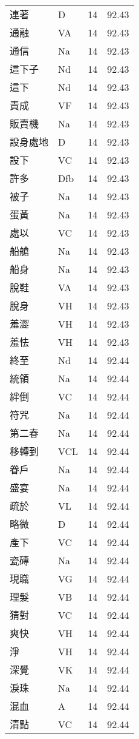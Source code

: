 \documentclass[twocolumn]{book}
\begin{document}
\begin{supertabular}{llrr}
連著 & D & 14 &  92.43\\
通融 & VA & 14 &  92.43\\
通信 & Na & 14 &  92.43\\
這下子 & Nd & 14 &  92.43\\
這下 & Nd & 14 &  92.43\\
責成 & VF & 14 &  92.43\\
販賣機 & Na & 14 &  92.43\\
設身處地 & D & 14 &  92.43\\
設下 & VC & 14 &  92.43\\
許多 & Dfb & 14 &  92.43\\
被子 & Na & 14 &  92.43\\
蛋黃 & Na & 14 &  92.43\\
處以 & VC & 14 &  92.43\\
船艙 & Na & 14 &  92.43\\
船身 & Na & 14 &  92.43\\
脫鞋 & VA & 14 &  92.43\\
脫身 & VH & 14 &  92.43\\
羞澀 & VH & 14 &  92.43\\
羞怯 & VH & 14 &  92.43\\
終至 & Nd & 14 &  92.44\\
統領 & Na & 14 &  92.44\\
絆倒 & VC & 14 &  92.44\\
符咒 & Na & 14 &  92.44\\
第二春 & Na & 14 &  92.44\\
移轉到 & VCL & 14 &  92.44\\
眷戶 & Na & 14 &  92.44\\
盛宴 & Na & 14 &  92.44\\
疏於 & VL & 14 &  92.44\\
略微 & D & 14 &  92.44\\
產下 & VC & 14 &  92.44\\
瓷磚 & Na & 14 &  92.44\\
現職 & VG & 14 &  92.44\\
理髮 & VB & 14 &  92.44\\
猜對 & VC & 14 &  92.44\\
爽快 & VH & 14 &  92.44\\
淨 & VH & 14 &  92.44\\
深覺 & VK & 14 &  92.44\\
淚珠 & Na & 14 &  92.44\\
混血 & A & 14 &  92.44\\
清點 & VC & 14 &  92.44\\

\end{supertabular}
\end{document}
